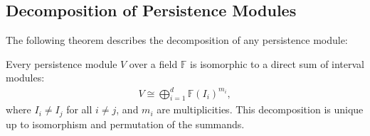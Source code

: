 \subsection{Decomposition of Persistence Modules}
The following theorem describes the decomposition of any persistence module:

\begin{theorem}[Decomposition]{\cite[\S 1.5]{chazal2016structure}}
\label{decompositionPersistenceModules}
Every persistence module $V$ over a field $\mathbb{F}$ is isomorphic to a direct sum of interval modules:
\begin{align}
	V \cong \bigoplus_{i=1}^{d} \mathbb{F}(I_i)^{m_i},
\end{align}
where $I_i \neq I_j$ for all $i \neq j$, and $m_i$ are multiplicities. This decomposition is unique up to isomorphism and permutation of the summands.
\end{theorem}

